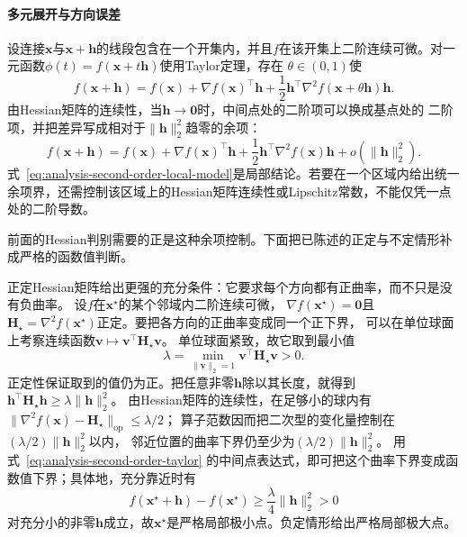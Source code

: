 \paragraph{多元展开与方向误差}

设连接$\bm{x}$与$\bm{x}+\bm{h}$的线段包含在一个开集内，并且$f$在该开集上二阶连续可微。对一元函数$\phi(t)=f(\bm{x}+t\bm{h})$使用Taylor定理，存在 $\theta\in(0,1)$使
\begin{equation}
  f(\bm{x}+\bm{h})
  =
  f(\bm{x})
  +\nabla f(\bm{x})^{\top}\bm{h}
  +\frac12
  \bm{h}^{\top}
  \nabla^2f(\bm{x}+\theta\bm{h})
  \bm{h}.
\label{eq:analysis-second-order-taylor}
\end{equation}
由Hessian矩阵的连续性，当$\bm{h}\to\bm{0}$时，中间点处的二阶项可以换成基点处的
二阶项，并把差异写成相对于$\lVert\bm h\rVert_2^2$趋零的余项：
\begin{equation}
  f(\bm{x}+\bm{h})
  =
  f(\bm{x})
  +\nabla f(\bm{x})^{\top}\bm{h}
  +\frac12\bm{h}^{\top}\nabla^2f(\bm{x})\bm{h}
  +o(\lVert\bm{h}\rVert_2^2).
\label{eq:analysis-second-order-local-model}
\end{equation}
式~\eqref{eq:analysis-second-order-local-model}是局部结论。若要在一个区域内给出统一余项界，还需控制该区域上的Hessian矩阵连续性或Lipschitz常数，不能仅凭一点处的二阶导数。

前面的Hessian判别需要的正是这种余项控制。下面把已陈述的正定与不定情形补成严格的函数值判断。

正定Hessian矩阵给出更强的充分条件：它要求每个方向都有正曲率，而不只是没有负曲率。
设$f$在$\bm{x}^{\star}$的某个邻域内二阶连续可微，
$\nabla f(\bm{x}^{\star})=\bm{0}$且
$\bm H_\star=\nabla^2f(\bm{x}^{\star})$正定。要把各方向的正曲率变成同一个正下界，
可以在单位球面上考察连续函数$\bm v\mapsto\bm v^\top\bm H_\star\bm v$。
单位球面紧致，故它取到最小值
\[
 \lambda=\min_{\lVert\bm v\rVert_2=1}\bm v^\top\bm H_\star\bm v>0.
\]
正定性保证取到的值仍为正。把任意非零$\bm h$除以其长度，就得到
$\bm h^\top\bm H_\star\bm h\geq\lambda\lVert\bm h\rVert_2^2$。
由Hessian矩阵的连续性，在足够小的球内有
$\lVert\nabla^2f(\bm x)-\bm H_\star\rVert_{\mathrm{op}}\leq\lambda/2$；
算子范数因而把二次型的变化量控制在$(\lambda/2)\lVert\bm h\rVert_2^2$以内，
邻近位置的曲率下界仍至少为$(\lambda/2)\lVert\bm h\rVert_2^2$。
用式~\eqref{eq:analysis-second-order-taylor}
的中间点表达式，即可把这个曲率下界变成函数值下界；具体地，充分靠近时有
\[   f(\bm{x}^{\star}+\bm{h})-f(\bm{x}^{\star})   \geq   \frac{\lambda}{4}\lVert\bm{h}\rVert_2^2>0 \]
对充分小的非零$\bm{h}$成立，故$\bm{x}^{\star}$是严格局部极小点。负定情形给出严格局部极大点。


